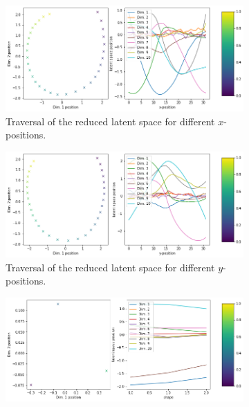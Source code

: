 \documentclass[11pt,a4paper]{article}
\begin{document}
\begin{figure}[H]
\centering
\begin{subfigure}{.48\textwidth}
\includegraphics[width=\textwidth]{images/latent_space_traversals/vae_6250_dsprites_latent_space_values_x_position.png}
\caption{Traversal of the reduced latent space for different $x$-positions.}
\end{subfigure}
\begin{subfigure}{.48\textwidth}
\includegraphics[width=\textwidth]{images/latent_space_traversals/vae_6250_dsprites_latent_space_values_y_position.png}
\caption{Traversal of the reduced latent space for different $y$-positions.}
\end{subfigure}
\begin{subfigure}{.48\textwidth}
\includegraphics[width=\textwidth]{images/latent_space_traversals/vae_6250_dsprites_latent_space_values_shape.png}

\end{subfigure}
\end{figure}
\end{document}
